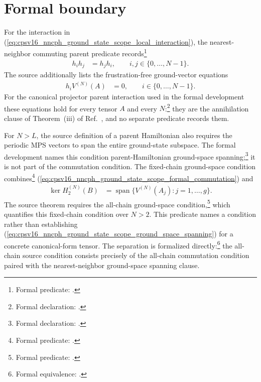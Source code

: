 \documentclass{article}
\begin{document}
\section{Formal boundary}

For the interaction in
(\ref{eq:cpsv16_nncph_ground_state_scope_local_interaction}), the
nearest-neighbor commuting parent predicate records\footnote{Formal predicate:
.}
\begin{align}
    h_i h_j
        &=h_j h_i,
        \qquad i,j\in\{0,\ldots,N-1\}.
    \label{eq:cpsv16_nncph_ground_state_scope_formal_commutation}
\end{align}
The source additionally lists the frustration-free ground-vector equations
\begin{align}
    h_i V^{(N)}(A)
        &=0,
        \qquad i\in\{0,\ldots,N-1\}.
    \label{eq:cpsv16_nncph_ground_state_scope_ground_vector}
\end{align}
For the canonical projector parent interaction used in the formal development
these equations hold for every tensor $A$ and every $N$:\footnote{Formal
declaration: .}
they are the annihilation clause of
Theorem~(iii) of Ref.~\cite{Cirac2016MPDO_arXiv}, and no
separate predicate records them.

For $N>L$, the source definition of a parent Hamiltonian also requires the
periodic MPS vectors to span the entire ground-state subspace. The formal
development names this condition parent-Hamiltonian ground-space
spanning;\footnote{Formal declaration:
.} it is not part of
the commutation condition. The fixed-chain ground-space condition
combines\footnote{Formal predicate: .}
(\ref{eq:cpsv16_nncph_ground_state_scope_formal_commutation}) and
\begin{align}
    \ker H_2^{(N)}(B)
        &=
        \operatorname{span}
        \{V^{(N)}(A_j):j=1,\ldots,g\}.
    \label{eq:cpsv16_nncph_ground_state_scope_ground_space_spanning}
\end{align}
The source theorem requires the all-chain ground-space condition,\footnote{Formal
predicate: .} which quantifies this
fixed-chain condition over $N>2$. This predicate names a condition rather than
establishing (\ref{eq:cpsv16_nncph_ground_state_scope_ground_space_spanning})
for a concrete canonical-form tensor. The separation is formalized
directly:\footnote{Formal equivalence:
.}
the all-chain source condition consists precisely of the all-chain
commutation condition paired with the nearest-neighbor ground-space spanning
clause.
\end{document}
